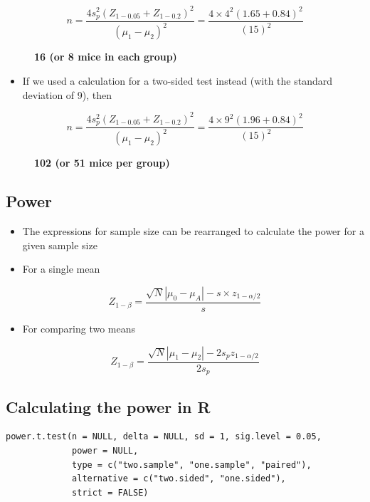 \documentclass[
]{book}
\providecommand{\tightlist}{%
  \setlength{\itemsep}{0pt}\setlength{\parskip}{0pt}}
\begin{document}
\begin{description}
\item[\[n = \frac{4s_p^2(Z_{1-0.05}+Z_{1-0.2})^2}{(\mu_1-\mu_2)^2}=\frac{4\times 4^2(1.65+0.84)^2}{(15)^2}\]]
\textbf{16 (or 8 mice in each group)}
\end{description}

\begin{itemize}
\tightlist
\item
  If we used a calculation for a two-sided test instead (with the standard deviation of 9), then
\end{itemize}

\begin{description}
\item[\[n = \frac{4s_p^2(Z_{1-0.05}+Z_{1-0.2})^2}{(\mu_1-\mu_2)^2}=\frac{4\times 9^2(1.96+0.84)^2}{(15)^2}\]]
\textbf{102 (or 51 mice per group)}
\end{description}

\hypertarget{power}{%
\subsection{Power}\label{power}}

\begin{itemize}
\tightlist
\item
  The expressions for sample size can be rearranged to calculate the power for a given sample size
\item
  For a single mean
\end{itemize}

\[Z_{1-\beta}=\frac{\sqrt N|\mu_0-\mu_A|-s\times z_{1-\alpha/2}}{s}\]

\begin{itemize}
\tightlist
\item
  For comparing two means
\end{itemize}

\[Z_{1-\beta}=\frac{\sqrt N|\mu_1-\mu_2|-2s_pz_{1-\alpha/2}}{2s_p}\]

\hypertarget{calculating-the-power-in-r}{%
\subsection{Calculating the power in R}\label{calculating-the-power-in-r}}

\begin{verbatim}
power.t.test(n = NULL, delta = NULL, sd = 1, sig.level = 0.05,
             power = NULL,
             type = c("two.sample", "one.sample", "paired"),
             alternative = c("two.sided", "one.sided"),
             strict = FALSE)
\end{verbatim}
\end{document}
